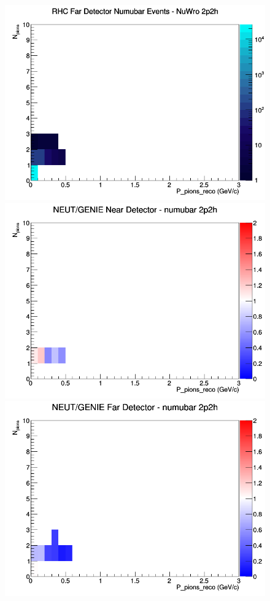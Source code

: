 \documentclass[12pt]{article}
\begin{document}
\begin{figure}[h]
\endminipage
{}
\includegraphics[width=\linewidth]{eff_N_P/FGT/pions/2p2h_RHC_FD_numubar_N_P_NuWro.png}
\endminipage
\newline
{}
\includegraphics[width=\linewidth]{eff_N_P/FGT/pions/ratios/2p2h_NEUT_GENIE_numubar_near_N_P.png}
\endminipage
{}
\includegraphics[width=\linewidth]{eff_N_P/FGT/pions/ratios/2p2h_NEUT_GENIE_numubar_far_N_P.png}

\end{figure}
\end{document}

